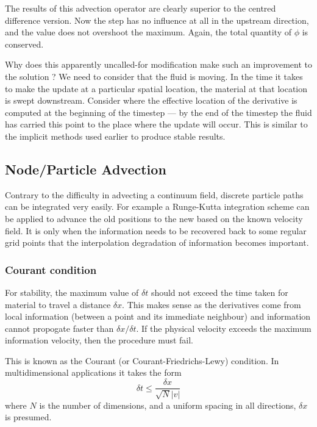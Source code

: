 \documentclass[10pt]{article}
\begin{document}
	The results of this advection operator are clearly superior to the centred 
	difference version. Now the step has no influence at all in the upstream direction,
	and the value does not overshoot the maximum. Again, the total quantity of
	$\phi$ is conserved. 
	
	Why does this apparently uncalled-for modification make such an improvement
	to the solution ?  We need to consider that the fluid is moving. In the time it
	takes to make the update at a particular spatial location, the material at 
	that location is swept downstream. Consider where the 
	effective location of the derivative is computed at the beginning of the
	timestep --- by the end of the timestep the fluid has carried this point
	to the place where the update will occur.  This is similar to the
	implicit methods used earlier to produce stable results.
	
	\subsection{Node/Particle Advection}
	
		Contrary to the difficulty in advecting a continuum field, discrete particle
		paths can be integrated very easily. For example a Runge-Kutta integration
		scheme can be applied to advance the old positions to the new
		based on the known velocity field. It is only when the information
		needs to be recovered back to some regular grid points that the 
		interpolation degradation of information becomes important.
	
	\subsubsection{Courant condition}
	For stability, the maximum value of $\delta t$ should not exceed the 
	time taken for material to travel a distance $\delta x$. This makes sense
	as the derivatives come from local information (between a point and its 
	immediate neighbour) and information cannot propogate faster than
	$\delta x / \delta t$. If the physical velocity exceeds the maximum information
	velocity, then the procedure must fail.
	
	This is known as the Courant (or Courant-Friedrichs-Lewy) condition.
	In multidimensional applications it takes the form
		\begin{equation}
			\delta t \le \frac{\delta x}{\sqrt{N} |v|}
		\end{equation}
	where $N$ is the number of dimensions, and a uniform spacing in all 
	directions, $\delta x$ is presumed.
	
\end{document}
